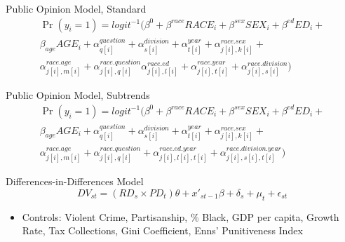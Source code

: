 \documentclass{beamer}
\begin{document}
\begin{frame}{Public Opinion Model, Standard}
\begin{equation*}
\label{standard}
\begin{split}
\Pr ( y_i = 1 ) =
logit^{-1} ( 
\beta^{0} + 
\beta^{race} RACE_{i} +
\beta^{sex} SEX_{i} + 
\beta^{ed} ED_{i} + \\
\beta_{age} AGE_{i} + 
\alpha_{q[i]}^{question} + 
\alpha_{s[i]}^{division} + 
\alpha_{t[i]}^{year} + 
\alpha_{j[i],k[i]}^{race.sex} + \\
\alpha_{j[i],m[i]}^{race.age} + 
\alpha_{j[i],q[i]}^{race.question} 
\alpha_{j[i],l[i]}^{race.ed} +
\alpha_{j[i],t[i]}^{race.year} + 
\alpha_{j[i],s[i]}^{race.division}
)
\end{split}
\end{equation*}
\end{frame}

\begin{frame}{Public Opinion Model, Subtrends}
\begin{equation*}
\label{subtrends}
\begin{split}
\Pr ( y_i = 1 ) =
logit^{-1} ( 
\beta^{0} + 
\beta^{race} RACE_{i} +
\beta^{sex} SEX_{i} + 
\beta^{ed} ED_{i} + \\
\beta_{age} AGE_{i} + 
\alpha_{q[i]}^{question} + 
\alpha_{s[i]}^{division} + 
\alpha_{t[i]}^{year} + 
\alpha_{j[i],k[i]}^{race.sex} + \\
\alpha_{j[i],m[i]}^{race.age} + 
\alpha_{j[i],q[i]}^{race.question} +
\alpha_{j[i],l[i],t[i]}^{race.ed.year} + 
\alpha_{j[i],s[i],t[i]}^{race.division.year}
)
\end{split}
\end{equation*}
\end{frame}


\begin{frame}{Differences-in-Differences Model}
\begin{equation*}
\label{dd_eq}
DV_{st} =  
(RD_{s} \times PD_{t}) \theta +
x'_{st-1} \beta + 
\delta_{s} + 
\mu_{t} + 
\epsilon_{st}
\end{equation*}
\begin{itemize}
    \item[] \alert{Controls:} Violent Crime, Partisanship, \% Black, GDP per capita, Growth Rate, Tax Collections, Gini Coefficient, Enns' Punitiveness Index
\end{itemize}
\end{frame}
\end{document}
